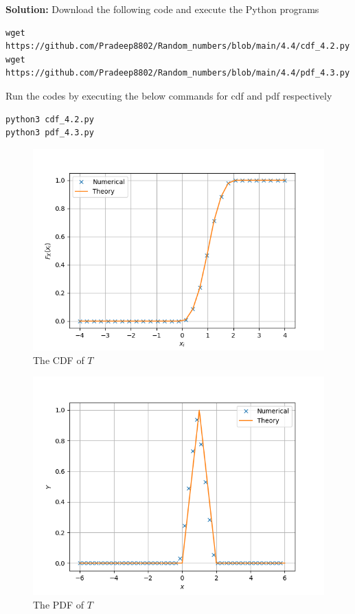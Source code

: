 \documentclass[journal,12pt,twocolumn]{IEEEtran}
\newcommand{\solution}{\noindent \textbf{Solution: }}
\numberwithin{equation}{section}
\renewcommand\thesection{\arabic{section}}
\begin{document}
\begin{enumerate}[label=\thesection.\arabic*,ref=\thesection.\theenumi]
\begin{enumerate}[label=\thesection.\arabic*,ref=\thesection.\theenumi]
	\solution Download the following code and execute the Python programs
	\begin{lstlisting}
wget https://github.com/Pradeep8802/Random_numbers/blob/main/4.4/cdf_4.2.py
wget https://github.com/Pradeep8802/Random_numbers/blob/main/4.4/pdf_4.3.py
	\end{lstlisting}
	Run the codes by executing the below commands for cdf and pdf respectively
	\begin{lstlisting}
python3 cdf_4.2.py
python3 pdf_4.3.py
	\end{lstlisting}
	
	
	\end{enumerate}
	
	\begin{figure}
		\centering
		\includegraphics[width=\columnwidth]{../figs/cdf_4.2.png}
		\caption{The CDF of $T$}
	\end{figure}
	
	\begin{figure}
		\centering
		\includegraphics[width=\columnwidth]{../figs/pdf_4.3.png}
		\caption{The PDF of $T$}
	\end{figure}		
	
\end{enumerate}
\end{document}

